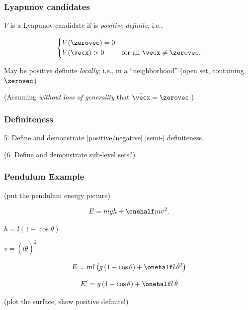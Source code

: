 \documentclass[12pt]{beamer}
\begin{document}
\begin{frame}
\frametitle{Lyapunov candidates}

\begin{itemize}


\vitem
$V$ is a Lyapunov candidate if is \emph{positive-definite}, i.e.,

\[
\begin{cases}
	V(\zerovec) = 0 &\\
	V(\vecx) > 0 & \text{for all $\vecx \neq \zerovec$}.
\end{cases}
\]

\vitem
May be positive definite \emph{locally}; i.e., in a ``neighborhood''
(open set, containing $\zerovec$)

\vitem
(Assuming \emph{without loss of generality} that $\bar{\vecx} = \zerovec$.)

\end{itemize}
\vfill\null
\end{frame}




\begin{frame}
\frametitle{Definiteness}

5. Define and demonstrate [positive/negative] [semi-] definiteness.

(6. Define and demonstrate sub-level sets?)

\end{frame}












\begin{frame}



\end{frame}





\begin{frame}
\frametitle{Pendulum Example}

(put the pendulum energy picture)

\[
E = mgh + \onehalf m v^2.
\]

$h = l(1-\cos\theta)$

$v = (l\dot\theta)^2$

\[
E
	= ml \left( g \, (1-\cos\theta) + \onehalf l \, \dot\theta^2 \right)
\]

\[
E' = g \, (1-\cos\theta) + \onehalf l \, \dot\theta
\]

(plot the surface, show positive definite!)

\end{frame}
\end{document}

